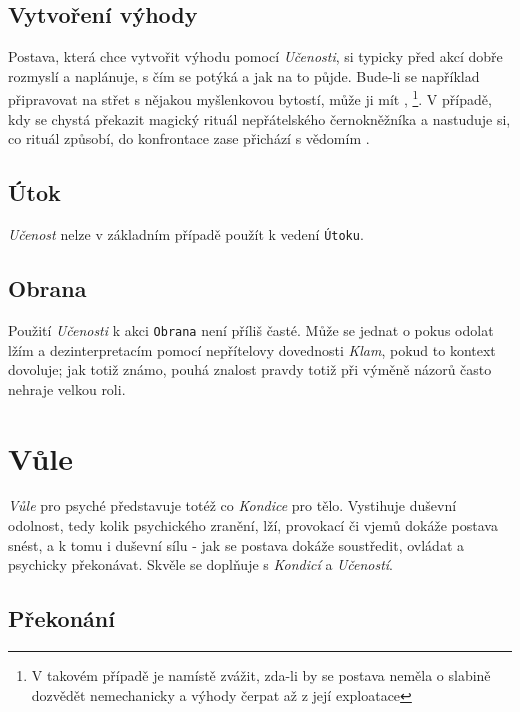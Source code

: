 \documentclass[../main.tex]{subfiles}
\begin{document}
\subsection*{Vytvoření výhody}
\label{subsec:ucenost-vytvoreni}
\vytvoreni

Postava, která chce vytvořit výhodu pomocí \textit{Učenosti}, si typicky před akcí dobře rozmyslí a naplánuje, s čím se potýká a jak na to půjde. Bude-li se například připravovat na střet s nějakou myšlenkovou bytostí, může ji mít ,  \footnote{V takovém případě je namístě zvážit, zda-li by se postava neměla o slabině dozvědět nemechanicky a výhody čerpat až z její exploatace}. V případě, kdy se chystá překazit magický rituál nepřátelského černokněžníka a nastuduje si, co rituál způsobí, do konfrontace zase přichází s vědomím .

\subsection*{Útok}
\label{subsec:ucenost-utok}
\utok

\textit{Učenost} nelze v základním případě použít k vedení \texttt{Útoku}.

\subsection*{Obrana}
\label{subsec:ucenost-obrana}
\obrana

Použití \textit{Učenosti} k akci \texttt{Obrana} není příliš časté. Může se jednat o pokus odolat lžím a dezinterpretacím pomocí nepřítelovy dovednosti \textit{Klam}, pokud to kontext dovoluje; jak totiž známo, pouhá znalost pravdy totiž při výměně názorů často nehraje velkou roli.

\section{Vůle}
\label{sec:vule}

\textit{Vůle} pro psyché představuje totéž co \textit{Kondice} pro tělo. Vystihuje duševní odolnost, tedy kolik psychického zranění, lží, provokací či vjemů dokáže postava snést, a k tomu i duševní sílu - jak se postava dokáže soustředit, ovládat a psychicky překonávat. Skvěle se doplňuje s \textit{Kondicí} a \textit{Učeností}.

\subsection*{Překonání}
\label{subsec:vule-prekonani}
\prekonani
\end{document}
